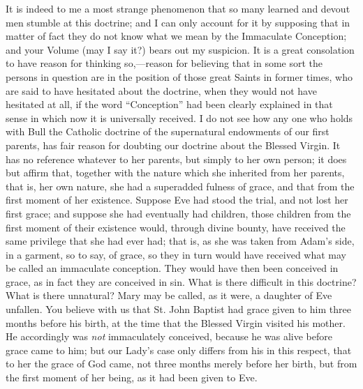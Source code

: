 It is indeed to me a most strange phenomenon that so many learned and
devout men stumble at this doctrine; and I can only account for it by
supposing that in matter of fact they do not know what we mean by the
Immaculate Conception; and your Volume (may I say it?) bears out my
suspicion. It is a great consolation to have reason for thinking so,—reason
for believing that in some sort the persons in question are in the
position of those great Saints in former times, who are said to have
hesitated about the doctrine, when they would not have hesitated at all,
if the word ``Conception'' had been clearly explained in that
sense in which now it is universally received. I do not see how any one
who holds with Bull the Catholic doctrine of the supernatural endowments
of our first parents, has fair reason for doubting our doctrine
about the Blessed Virgin. It has no reference whatever to her parents,
but simply to her own person; it does but affirm that, together with the
nature which she inherited from her parents, that is, her own nature,
she had a superadded fulness of grace, and that from the first moment of
her existence. Suppose Eve had stood the trial, and not lost her first
grace; and suppose she had eventually had children, those children from
the first moment of their existence would, through divine bounty, have
received the same privilege that she had ever had; that is, as she was
taken from Adam's side, in a garment, so to say, of grace, so they in
turn would have received what may be called an immaculate conception.
They would have then been conceived in grace, as in fact they are
conceived in sin. What is there difficult in this doctrine? What is
there unnatural? Mary may be called, as it were, a daughter of Eve
unfallen. You believe with us that St. John Baptist had grace given to
him three months before his birth, at the time that the Blessed Virgin
visited his mother. He accordingly was \emph{not} immaculately
conceived, because he was alive before grace came to him; but our Lady's
case only differs from his in this respect, that to her the grace of God
came, not three months merely before her birth, but from the first
moment of her being, as it had been given to Eve.

